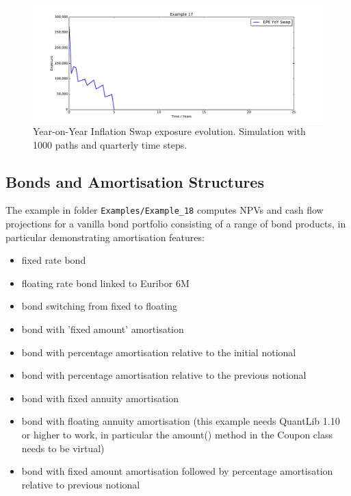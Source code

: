 \documentclass[12pt, a4paper]{article}
\begin{document}
\begin{figure}[h!]
	\begin{center}
		\includegraphics[scale=0.45]{mpl_yoy_swap.pdf}
	\end{center}
	\caption{Year-on-Year Inflation Swap exposure evolution. Simulation with 1000 paths and quarterly time steps.}
	\label{fig_yoy_swap}
\end{figure}

\subsection{Bonds and Amortisation Structures}%

The example in folder {\tt Examples/Example\_18} computes NPVs and cash flow projections for a vanilla bond portfolio
consisting of a range of bond products, in particular demonstrating amortisation features:
\begin{itemize}
\item fixed rate bond
\item floating rate bond linked to Euribor 6M
\item bond switching from fixed to floating
\item bond with 'fixed amount' amortisation
\item bond with percentage amortisation relative to the initial notional
\item bond with percentage amortisation relative to the previous notional
\item bond with fixed annuity amortisation
\item bond with floating annuity amortisation (this example needs QuantLib 1.10 or higher to work, in particular the amount() method in the Coupon class needs to be virtual)
\item bond with fixed amount amortisation followed by percentage amortisation relative to previous notional
\end{itemize}
\end{document}

